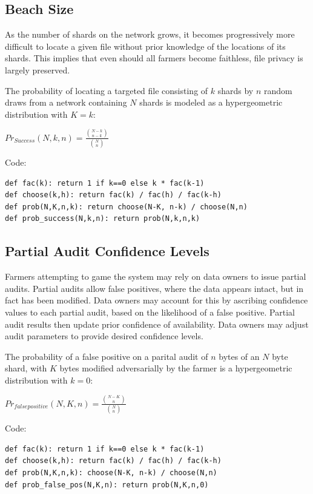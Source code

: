 \documentclass[a4paper,10pt]{article}
\begin{document}
\subsection{Beach Size}
As the number of shards on the network grows, it becomes progressively more difficult to locate a given file without prior knowledge of the locations of its shards. This implies that even should all farmers become faithless, file privacy is largely preserved.

The probability of locating a targeted file consisting of $ k $ shards by $ n $ random draws from a network containing $ N $ shards is modeled as a hypergeometric distribution with $ K = k $:

{\centering
$Pr_{Success}(N,k,n) = \displaystyle \frac{{N-k \choose n-k}}{{N \choose n}}$
\\}


Code:
\begin{lstlisting}
def fac(k): return 1 if k==0 else k * fac(k-1)
def choose(k,h): return fac(k) / fac(h) / fac(k-h)
def prob(N,K,n,k): return choose(N-K, n-k) / choose(N,n)
def prob_success(N,k,n): return prob(N,k,n,k)
\end{lstlisting}

\subsection{Partial Audit Confidence Levels}
Farmers attempting to game the system may rely on data owners to issue partial audits. Partial audits allow false positives, where the data appears intact, but in fact has been modified. Data owners may account for this by ascribing confidence values to each partial audit, based on the likelihood of a false positive. Partial audit results then update prior confidence of availability. Data owners may adjust audit parameters to provide desired confidence levels.

The probability of a false positive on a parital audit of $ n $ bytes of an $ N $ byte shard, with $ K $ bytes modified adversarially by the farmer is a hypergeometric distribution with $ k = 0 $:

{\centering
$Pr_{false positive}(N,K,n) = \displaystyle \frac{{N-K \choose n}} {{N \choose n}}$
\\}


Code:
\begin{lstlisting}
def fac(k): return 1 if k==0 else k * fac(k-1)
def choose(k,h): return fac(k) / fac(h) / fac(k-h)
def prob(N,K,n,k): choose(N-K, n-k) / choose(N,n)
def prob_false_pos(N,K,n): return prob(N,K,n,0)
\end{lstlisting}
\end{document}
